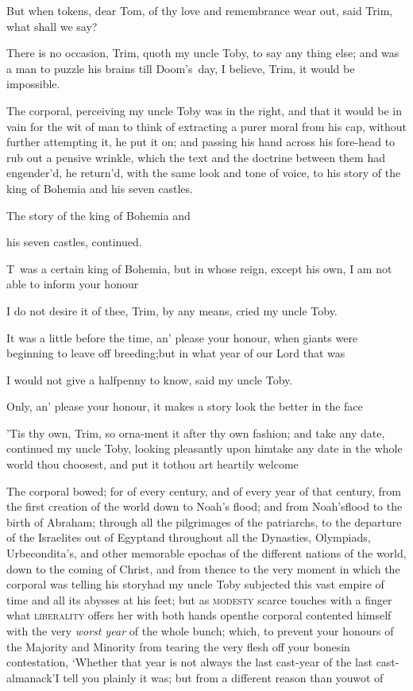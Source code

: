 \documentclass{article}
\begin{document}
\tsh But when tokens, dear Tom, of thy love and
remembrance wear out, said Trim, what shall we say?

There is no occasion, Trim, quoth my uncle Toby,
to say any thing else; and was a man to puzzle his brains till
Doom’s~day, I believe, Trim, it would be
impossible.

The corporal, perceiving my uncle Toby was in the right,
and that it would be in vain for the wit of man to think of
extracting a purer moral from his cap, without further attempting
it, he put it on; and passing his hand across his fore-\pb head to rub
out a pensive wrinkle, which the text and the doctrine between them
had engender’d, he return’d, with the same look and
tone of voice, to his story of the king of Bohemia and his
seven castles.

\newpage
\centerline{The story of the king of Bohemia and}
\centerline{his seven castles, continued.}

\lettrine{T}{\,} was a certain king of\break
Bohemia, but in whose reign, except his
own, I am not able to inform your honour\tsh

I do not desire it of thee, Trim, by any means, cried my
uncle Toby.

\tsh It was a little before the time, an’ please
your honour, when giants were beginning to leave off
breeding;\tsk\break but in what year of our Lord that\break
was\tsh

\newpage
\tsh I would not give a halfpenny to know, said my uncle
Toby.

\tsh Only, an’ please your honour, it makes a
story look the better in the face\tsh

\tsh ’Tis thy own, Trim, so orna-\break ment it
after thy own fashion; and take any date, continued my uncle Toby,\break
looking pleasantly upon him\tsk take any date in the
whole world thou choosest, and put it to\tsk thou art heartily
welcome\tsh

The corporal bowed; for of every century, and of every year of
that century, from the first creation of the world down to
Noah’s flood; and from Noah’s\pb flood to
the birth of Abraham; through all the pilgrimages of the
patriarchs, to the departure of the Israelites out of
Egypt\tsh and throughout all the Dynasties,
Olympiads, Urbecondita’s, and other memorable epochas of the
different nations of the world, down to the coming of Christ, and
from thence to the very moment in which the corporal was telling
his story\tsh had my uncle Toby subjected this vast
empire of time and all its abysses at his feet; but as \textsc{modesty} scarce touches with a
finger what \textsc{liberality} offers her with both hands
open\tsk the corporal contented himself with the very \textit{worst
year} of the whole bunch; which, to prevent your honours of the
Majority and Minority from tearing the very flesh off your bones\pb in
contestation, ‘Whether that year is not always the last
cast-year of the last cast-almanack’\tsh I tell you
plainly it was; but from a different reason than you\break wot of\tsh
\end{document}
